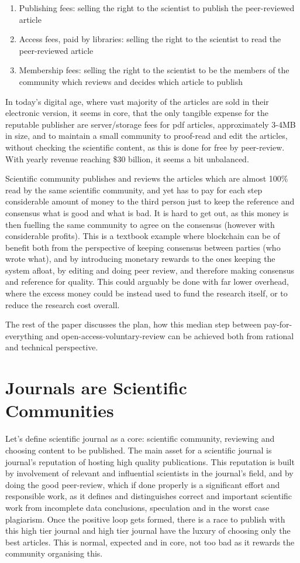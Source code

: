 \documentclass[12pt, a4paper]{article}
\begin{document}
\begin{enumerate}
	\item Publishing fees: selling the right to the scientist to publish the peer-reviewed article
	\item Access fees, paid by libraries: selling the right to the scientist to read the peer-reviewed article
	\item Membership fees: selling the right to the scientist to be the members of the community which reviews and decides which article to publish
\end{enumerate}
In today's digital age, where vast majority of the articles are sold in their electronic version, it seems in core, that the only tangible expense for the reputable publisher are server/storage fees for pdf articles, approximately 3-4MB in size, and to maintain a small community to proof-read and edit the articles, without checking the scientific content, as this is done for free by peer-review. With yearly revenue reaching \$30 billion, it seems a bit unbalanced.

Scientific community publishes and reviews the articles which are almost 100\% read by the same scientific community, and yet has to pay for each step considerable amount of money to the third person just to keep the reference and consensus what is good and what is bad. It is hard to get out, as this money is then fuelling the same community to agree on the consensus (however with considerable profits). This is a textbook example where blockchain can be of benefit both from the perspective of keeping consensus between parties (who wrote what), and by introducing monetary rewards to the ones keeping the system afloat, by editing and doing peer review, and therefore making consensus and reference for quality. This could arguably be done with far lower overhead, where the excess money could be instead used to fund the research itself, or to reduce the research cost overall.

The rest of the paper discusses the plan, how this median step between pay-for-everything and open-access-voluntary-review can be achieved both from rational and technical perspective.

\section{Journals are Scientific Communities}

Let's define scientific journal as a core: scientific community, reviewing and choosing content to be published. The main asset for a scientific journal is journal's reputation of hosting high quality publications. This reputation is built by involvement of relevant and influential scientists in the journal's field, and by doing the good peer-review, which if done properly is a significant effort and responsible work, as it defines and distinguishes correct and important scientific work from incomplete data conclusions, speculation and in the worst case plagiarism. Once the positive loop gets formed, there is a race to publish with this high tier journal and high tier journal have the luxury of choosing only the best articles. This is normal, expected and in core, not too bad as it rewards the community organising this.
\end{document}
